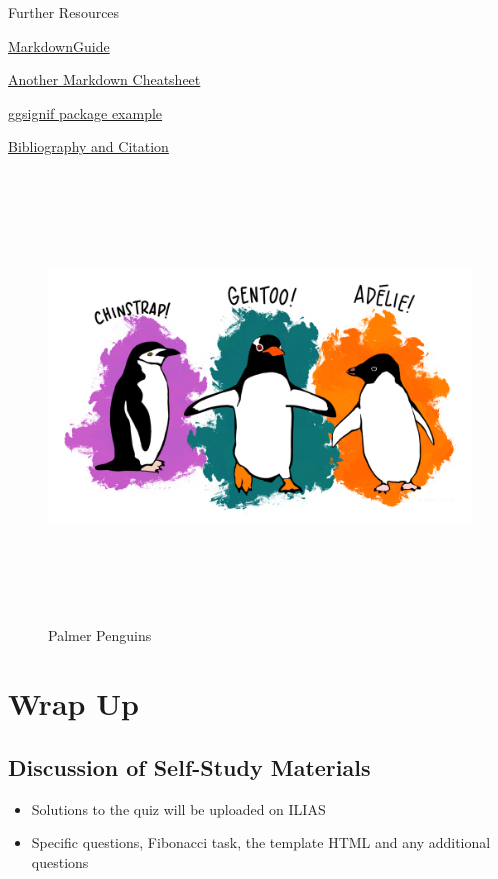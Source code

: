 \documentclass[
]{book}
\providecommand{\tightlist}{%
  \setlength{\itemsep}{0pt}\setlength{\parskip}{0pt}}
\begin{document}
Further Resources

\href{https://www.markdownguide.org/basic-syntax/}{MarkdownGuide}

\href{https://www.markdownguide.org/cheat-sheet/}{Another Markdown Cheatsheet}

\href{https://statisticsglobe.com/ggsignif-package-r}{ggsignif package example}

\href{https://bookdown.org/yihui/rmarkdown-cookbook/bibliography.html}{Bibliography and Citation}

\begin{figure}
\centering
\includegraphics[width=\textwidth,height=4.6875in]{./img/palmer_penguins.png}
\caption{Palmer Penguins}\label{id}
\end{figure}

\chapter{Wrap Up}\label{wrap-up}

\section{Discussion of Self-Study Materials}\label{discussion-of-self-study-materials}

\begin{itemize}
\tightlist
\item
  Solutions to the quiz will be uploaded on ILIAS
\item
  Specific questions, Fibonacci task, the template HTML and any additional questions
\end{itemize}
\end{document}
